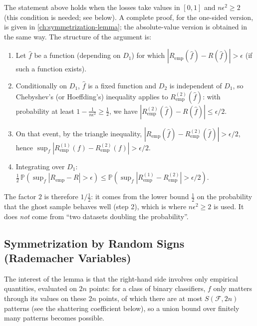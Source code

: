 \begin{notechapter}
The statement above holds when the losses take values in $[0,1]$ and $n\epsilon^2 \geq 2$
(this condition is needed; see below). A complete proof, for the one-sided version, is given in
\cref{ch:symmetrization-lemma}; the absolute-value version is obtained in the same way. The
structure of the argument is:
\begin{enumerate}
  \item Let $\hat f$ be a function (depending on $D_1$) for which $|R_{\text{emp}}(\hat f) - R(\hat f)| > \epsilon$
        (if such a function exists).
  \item Conditionally on $D_1$, $\hat f$ is a fixed function and $D_2$ is independent of $D_1$, so
        Chebyshev's (or Hoeffding's) inequality applies to $R_{\text{emp}}^{(2)}(\hat f)$: with probability at least
        $1 - \frac{1}{n\epsilon^2} \geq \frac{1}{2}$, we have $|R_{\text{emp}}^{(2)}(\hat f) - R(\hat f)| \leq \epsilon/2$.
  \item On that event, by the triangle inequality,
        $|R_{\text{emp}}(\hat f) - R_{\text{emp}}^{(2)}(\hat f)| > \epsilon/2$, hence
        $\sup_f |R_{\text{emp}}^{(1)}(f) - R_{\text{emp}}^{(2)}(f)| > \epsilon/2$.
  \item Integrating over $D_1$: $\frac{1}{2}\,\mathbb{P}(\sup_f |R_{\text{emp}} - R| > \epsilon) \leq
        \mathbb{P}(\sup_f |R_{\text{emp}}^{(1)} - R_{\text{emp}}^{(2)}| > \epsilon/2)$.
\end{enumerate}
The factor $2$ is therefore $1/\frac{1}{2}$: it comes from the lower bound $\frac{1}{2}$ on the probability that the
ghost sample behaves well (step 2), which is where $n\epsilon^2 \geq 2$ is used. It does \emph{not} come from
``two datasets doubling the probability''.

\subsection{Symmetrization by Random Signs (Rademacher Variables)}

The interest of the lemma is that the right-hand side involves only empirical quantities, evaluated on
$2n$ points: for a class of binary classifiers, $f$ only matters through its values on these $2n$ points,
of which there are at most $S(\mathcal{F}, 2n)$ patterns (see the shattering coefficient below), so a
union bound over finitely many patterns becomes possible.


\end{notechapter}
